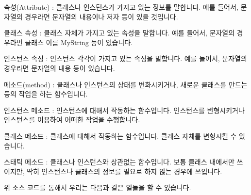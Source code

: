 \begin{compactitem}
\item 속성(Attribute) : 클래스나 인스턴스가 가지고 있는 정보를 말합니다. 예를 들어서, 문자열의 경우라면 문자열의 내용이나 저자 등이 있을 것입니다. 
\begin{compactitem} 
\item 클래스 속성  : 클래스 자체가 가지고 있는 속성을 말합니다. 예를 들어서, 문자열의 경우라면 클래스 이름 MyString 등이 있습니다. 
\item 인스턴스 속성 : 인스턴스 각각이 가지고 있는 속성을 말합니다. 예를 들어서, 문자열의 경우라면 문자열의 내용 등이 있습니다. 
\end{compactitem}
\item 메소드(method) : 클래스나 인스턴스의 상태를 변화시키거나, 새로운 클래스를 만드는 등의 작업을 하는 함수입니다. 
\begin{compactitem} 
\item 인스턴스 메소드 : 인스턴스에 대해서 작동하는 함수입니다. 인스턴스를 변형시키거나 인스턴스를 이용하여 어떠한 작업을 수행합니다. 
\item 클래스 메소드 : 클래스에 대해서 작동하는 함수입니다. 클래스 자체를 변형시킬 수 있습니다. 
\item 스태틱 메소드 : 클래스나 인스턴스와 상관없는 함수입니다. 보통 클래스 내에서만 쓰이지만, 딱히 인스턴스나 클래스의 정보를 필요로 하지 않는 경우에 쓰입니다. 

\end{compactitem}
\end{compactitem}



위 소스 코드를 통해서 우리는 다음과 같은 일들을 할 수 있습니다. 






%

%
%

